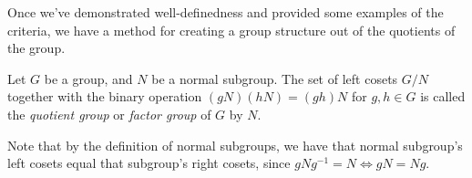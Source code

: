 Once we've demonstrated well-definedness and provided some examples of the criteria, we
have a method for creating a group structure out of the quotients of the group. 

\begin{definition}
  Let $G$ be a group, and $N$ be a normal subgroup. The set of left cosets $G/N$ together
  with the binary operation $(gN)(hN)=(gh)N$ for $g,h\in G$ is called the \emph{quotient
  group} or \emph{factor group} of $G$ by $N$.
  \label{quotientGroup}
\end{definition}
Note that by the definition of normal subgroups, we have that normal subgroup's left
cosets equal that subgroup's right cosets, since $gNg^{-1}=N\iff gN=Ng$.
